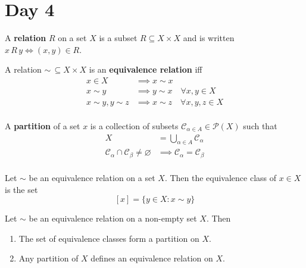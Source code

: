 \section{Day 4}

\begin{df}
A \textbf{relation} $R$ on a set $X$ is a subset $R \subseteq X \times
X$ and is written $x \, R \, y \Leftrightarrow (x, y) \in R$.
\end{df}

\begin{df}
A relation $\sim \, \subseteq X \times X$ is an \textbf{equivalence
relation} iff
\[ \begin{aligned}
x \in X &\implies x \sim x \\
x \sim y &\implies y \sim x \quad \forall x, y \in X \\
x \sim y, y \sim z &\implies x \sim z \quad \forall x, y, z \in X \\
\end{aligned} \]
\end{df}

\begin{df}
A \textbf{partition} of a set $x$ is a collection of subsets
$\mathcal{C}_{\alpha \in A} \in \mathcal{P}(X)$ such that
\[ \begin{aligned}
X &= \bigcup_{\alpha \in A} \mathcal{C}_\alpha \\
\mathcal{C}_\alpha \cap \mathcal{C}_\beta \neq \varnothing &\implies
\mathcal{C}_\alpha = \mathcal{C}_\beta \\
\end{aligned} \]
\end{df}

\begin{df}
Let $\sim$ be an equivalence relation on a set $X$. Then the equivalence
class of $x \in X$ is the set
\[ [x] = \lbrace y \in X : x \sim y \rbrace \]
\end{df}

\begin{thm}
Let $\sim$ be an equivalence relation on a non-empty set $X$. Then
\begin{enumerate}
\item The set of equivalence classes form a partition on $X$.
\item Any partition of $X$ defines an equivalence relation on $X$.
\end{enumerate}
\end{thm}

